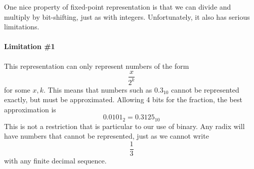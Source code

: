 One nice property of fixed-point representation is that we can divide
and multiply by bit-shifting, just as with integers.  Unfortunately,
it also has serious limitations.

\paragraph{Limitation \#1} This representation can only represent
numbers of the form
\[
  \frac{x}{2^{k}}
\]
for some $x,k$.  This means that numbers such as $0.3_{10}$ cannot be
represented exactly, but must be approximated.  Allowing 4 bits for
the fraction, the best approximation is
\begin{equation*}
  0.0101_{2} = 0.3125_{10}
\end{equation*}
This is not a restriction that is particular to our use of binary.
Any radix will have numbers that cannot be represented, just as we cannot write
\[
  \frac{1}{3}
\]
with any finite decimal sequence.

